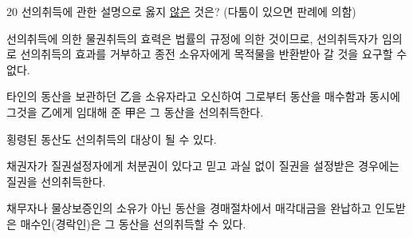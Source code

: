 \begin{question}{20}
선의취득에 관한 설명으로 옳지 \uline{않은} 것은? (다툼이 있으면 판례에 의함)
\begin{choices}
  \item 선의취득에 의한 물권취득의 효력은 법률의 규정에 의한 것이므로, 선의취득자가 임의로 선의취득의 효과를 거부하고 종전 소유자에게 목적물을 반환받아 갈 것을 요구할 수 없다.
  \item 타인의 동산을 보관하던 乙을 소유자라고 오신하여 그로부터 동산을 매수함과 동시에 그것을 乙에게 임대해 준 甲은 그 동산을 선의취득한다.
  \item 횡령된 동산도 선의취득의 대상이 될 수 있다.
  \item 채권자가 질권설정자에게 처분권이 있다고 믿고 과실 없이 질권을 설정받은 경우에는 질권을 선의취득한다.
  \item 채무자나 물상보증인의 소유가 아닌 동산을 경매절차에서 매각대금을 완납하고 인도받은 매수인(경락인)은 그 동산을 선의취득할 수 있다.
\end{choices}
\end{question}

